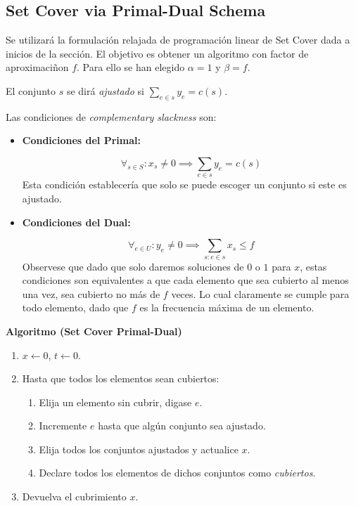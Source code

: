 \documentclass[../np-approximations.tex]{subfiles}
\begin{document}
\subsection{Set Cover via Primal-Dual Schema}

Se utilizará la formulación relajada de programación linear de Set Cover dada a inicios 
de la sección. El objetivo es obtener un algoritmo con factor de aproximaciñon $f$. Para 
ello se han elegido $\alpha=1$ y $\beta=f$.

El conjunto $s$ se dirá \emph{ajustado} si $\sum_{e \in s} y_e = c(s)$.

Las condiciones de \emph{complementary slackness} son:
\begin{itemize}
	\item \textbf{Condiciones del Primal:}

	      \begin{equation*}
	      	\forall_{s\in S}:  x_s \neq 0 \implies \sum_{e \in s} y_e = c(s)
		  \end{equation*}
		  Esta condición establecería que solo se puede escoger un conjunto si este es ajustado.
	\item \textbf{Condiciones del Dual:}

	      \begin{equation*}
	      	\forall_{e\in U}: y_e \neq 0 \implies \sum_{s: e \in s} x_s \le f
		  \end{equation*}
		  Observese que dado que solo daremos soluciones de $0$ o $1$ para $x$, estas condiciones son equivalentes a que cada elemento que sea cubierto al menos una vez, sea cubierto no más de $f$ veces. Lo cual claramente se cumple para todo elemento, dado que $f$ es la frecuencia máxima de un elemento.
\end{itemize}

\bigskip
\begin{tcolorbox}
	\textbf{Algoritmo (Set Cover Primal-Dual)}
	\begin{enumerate}
		\item $x \leftarrow 0$, $t \leftarrow 0$.
		\item Hasta que todos los elementos sean cubiertos:
			\begin{enumerate}
				\item Elija un elemento sin cubrir, digase $e$.
				\item Incremente $e$ hasta que algún conjunto sea ajustado.
				\item Elija todos los conjuntos ajustados y actualice $x$.
				\item Declare todos los elementos de dichos conjuntos como
				\emph{cubiertos}.
			\end{enumerate}
		\item Devuelva el cubrimiento $x$.
	\end{enumerate}
\end{tcolorbox}
\bigskip
\end{document}
